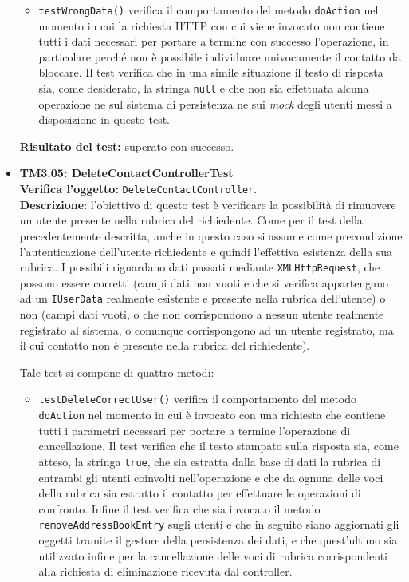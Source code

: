 \begin{itemize}
\begin{itemize}
\item \texttt{testWrongData()} verifica il comportamento del metodo \texttt{doAction} nel momento in cui la richiesta HTTP con cui viene invocato non contiene tutti i dati necessari per portare a termine con successo l'operazione, in particolare perché non è possibile individuare univocamente il contatto da bloccare. Il test verifica che in una simile situazione il testo di risposta sia, come desiderato, la stringa \texttt{null} e che non sia effettuata alcuna operazione ne sul sistema di persistenza ne sui \textit{mock} degli utenti messi a disposizione in questo test.
\end{itemize}
\textbf{Risultato del test:} superato con successo.

\item \textbf{TM3.05: DeleteContactControllerTest}\\
\textbf{Verifica l'oggetto:} \texttt{DeleteContactController}.\\
\textbf{Descrizione}: l'obiettivo di questo test è verificare la possibilità di rimuovere un utente presente nella rubrica del richiedente. Come per il test della  precedentemente descritta, anche in questo caso si assume come precondizione l'autenticazione dell'utente richiedente e quindi l'effettiva esistenza della sua rubrica. 
I possibili  riguardano dati passati mediante \texttt{XMLHttpRequest}, che possono essere corretti (campi dati non vuoti e che si verifica appartengano ad un \texttt{IUserData} realmente esistente e presente nella rubrica dell'utente) o non (campi dati vuoti, o che non corrispondono a nessun utente realmente registrato al sistema, o comunque corrispongono ad un utente registrato, ma il cui contatto non è presente nella rubrica del richiedente). %

Tale test si compone di quattro metodi:
\begin{itemize}
\item \texttt{testDeleteCorrectUser()} verifica il comportamento del metodo \texttt{doAction} nel momento in cui è invocato con una richiesta che contiene tutti i parametri necessari per portare a termine l'operazione di cancellazione. Il test verifica che il testo stampato sulla risposta sia, come atteso, la stringa \texttt{true}, che sia estratta dalla base di dati la rubrica di entrambi gli utenti coinvolti nell'operazione e che da ognuna delle voci della rubrica sia estratto il contatto per effettuare le operazioni di confronto. Infine il test verifica che sia invocato il metodo \texttt{removeAddressBookEntry} sugli utenti e che in seguito siano aggiornati gli oggetti tramite il gestore della persistenza dei dati, e che quest'ultimo sia utilizzato infine per la cancellazione delle voci di rubrica corrispondenti alla richiesta di eliminazione ricevuta dal controller.


\end{itemize}
\end{itemize}
